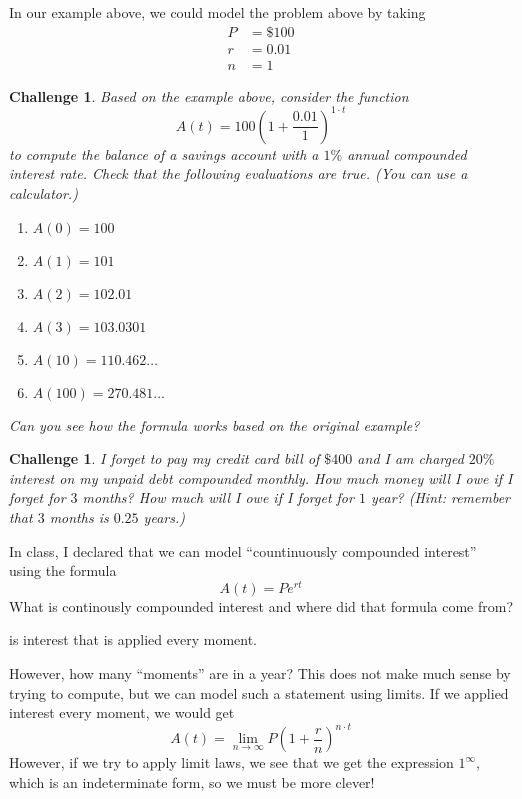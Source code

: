 \documentclass[12pt]{article}
\theoremstyle{mainstyle} %
\theoremstyle{longstyle}
\newtheorem{ex}[thm]{Challenge}
\begin{document}
In our example above, we could model the problem above by taking
\begin{align*}
  P & = \$100 \\
  r & = 0.01 \\
  n & = 1
\end{align*}
\begin{ex}
  Based on the example above, consider the function \[
    A(t) = 100 \left( 1 + \frac{0.01}{1} \right)^{1 \cdot t}
  \]
  to compute the balance of a savings account with a \(1\%\) annual
  compounded interest rate. Check that the following evaluations are
  true. (You can use a calculator.)
  \begin{enumerate}
  \item \(A(0) = 100\)
  \item \(A(1) = 101\)
  \item \(A(2) = 102.01\)
  \item \(A(3) = 103.0301\)
  \item \(A(10) = 110.462\ldots\)
  \item \(A(100) = 270.481\ldots\)
  \end{enumerate}
  Can you see how the formula works based on the original example?
\end{ex}
\begin{ex}
  I forget to pay my credit card bill of \(\$400\) and I am charged
  \(20\%\) interest on my unpaid debt compounded monthly. How much
  money will I owe if I forget for \(3\) months? How much will I owe
  if I forget for \(1\) year? (Hint: remember that \(3\) months is
  \(0.25\) years.)
\end{ex}
In class, I declared that we can model ``countinuously compounded
interest'' using the formula \[
  A(t) = P e^{rt}
\]
What is continously compounded interest and where did that formula
come from?
\begin{defn}
   is interest that is applied
  every moment. 
\end{defn}
However, how many ``moments'' are in a year? This does not make much
sense by trying to compute, but we can model such a statement using
limits. If we applied interest every moment, we would get \[
  A(t) = \lim_{n \to \infty} P \left( 1 + \frac{r}{n} \right)^{n \cdot t}
\]
However, if we try to apply limit laws, we see that we get the
expression \(1^\infty\), which is an indeterminate form, so we must be
more clever!
\end{document}
